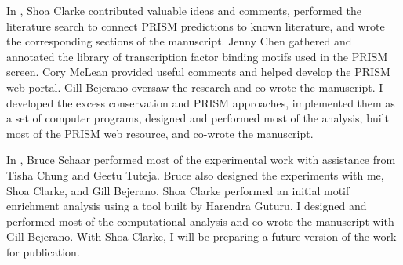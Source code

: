 In , 
Shoa Clarke contributed valuable ideas and comments, performed the literature search to
connect PRISM predictions to known literature, and wrote the corresponding sections of the manuscript.  Jenny Chen
gathered and annotated the library of transcription factor binding motifs used in the PRISM screen.  Cory McLean provided
useful comments and helped develop the PRISM web portal.  Gill Bejerano 
oversaw the research and co-wrote the manuscript.  I developed the excess conservation and PRISM approaches, implemented them
as a set of computer programs, designed and performed most of the analysis, built most of the PRISM web resource, and co-wrote the manuscript.
%

In ,
Bruce Schaar performed most of the experimental work with assistance from Tisha Chung and Geetu Tuteja.  Bruce also
designed the experiments with me, Shoa Clarke, and Gill Bejerano.  Shoa Clarke performed an initial motif enrichment
analysis using a tool built by Harendra Guturu.  I designed and performed most of the computational analysis and co-wrote the
manuscript with Gill Bejerano.  With Shoa Clarke, I will be preparing a future version of the work for publication.

